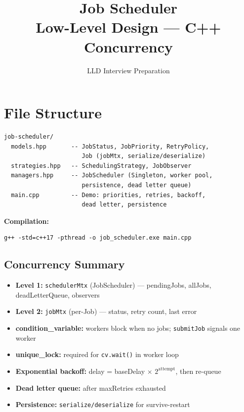 \documentclass[11pt,a4paper]{article}
\title{\Huge\textbf{Job Scheduler}\\[0.3em]\Large Low-Level Design --- C++ Concurrency}
\author{LLD Interview Preparation}
\date{}
\begin{document}
\maketitle
\tableofcontents
\newpage

\section{File Structure}
\begin{verbatim}
job-scheduler/
  models.hpp       -- JobStatus, JobPriority, RetryPolicy,
                      Job (jobMtx, serialize/deserialize)
  strategies.hpp   -- SchedulingStrategy, JobObserver
  managers.hpp     -- JobScheduler (Singleton, worker pool,
                      persistence, dead letter queue)
  main.cpp         -- Demo: priorities, retries, backoff,
                      dead letter, persistence
\end{verbatim}

\textbf{Compilation:}
\begin{verbatim}
g++ -std=c++17 -pthread -o job_scheduler.exe main.cpp
\end{verbatim}

\subsection{Concurrency Summary}
\begin{itemize}
    \item \textbf{Level 1:} \texttt{schedulerMtx} (JobScheduler) --- pendingJobs, allJobs, deadLetterQueue, observers
    \item \textbf{Level 2:} \texttt{jobMtx} (per-Job) --- status, retry count, last error
    \item \textbf{condition\_variable:} workers block when no jobs; \texttt{submitJob} signals one worker
    \item \textbf{unique\_lock:} required for \texttt{cv.wait()} in worker loop
    \item \textbf{Exponential backoff:} delay = baseDelay $\times$ $2^{\text{attempt}}$, then re-queue
    \item \textbf{Dead letter queue:} after maxRetries exhausted
    \item \textbf{Persistence:} \texttt{serialize/deserialize} for survive-restart
\end{itemize}
\end{document}
